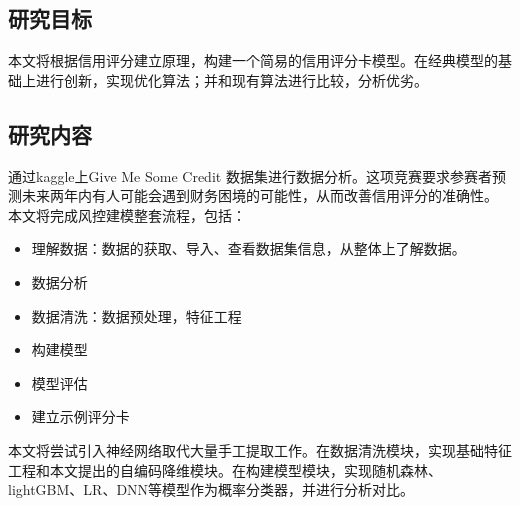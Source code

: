 \subsection{研究目标}
本文将根据信用评分建立原理，构建一个简易的信用评分卡模型。在经典模型的基础上进行创新，实现优化算法；并和现有算法进行比较，分析优劣。

\subsection{研究内容}
通过kaggle上Give Me Some Credit\cite{ref4} 数据集进行数据分析。这项竞赛要求参赛者预测未来两年内有人可能会遇到财务困境的可能性，从而改善信用评分的准确性。
本文将完成风控建模整套流程，包括：

\begin{itemize}
	\item 理解数据：数据的获取、导入、查看数据集信息，从整体上了解数据。
	\item 数据分析
	\item 数据清洗：数据预处理，特征工程
	\item 构建模型
	\item 模型评估
	\item 建立示例评分卡	
\end{itemize}
本文将尝试引入神经网络取代大量手工提取工作。在数据清洗模块，实现基础特征工程和本文提出的自编码降维模块。在构建模型模块，实现随机森林、lightGBM、LR、DNN等模型作为概率分类器，并进行分析对比。








